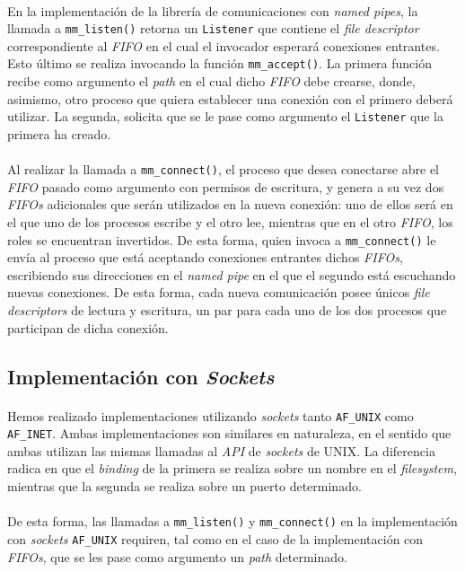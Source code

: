 \documentclass[spanish]{article}
\begin{document}
\paragraph{} En la implementación de la librería de comunicaciones con \textit{named pipes}, la llamada a \verb|mm_listen()| retorna un \verb|Listener| que contiene el \textit{file descriptor} correspondiente al \textit{FIFO} en el cual el invocador esperará conexiones entrantes. Esto último se realiza invocando la función \verb|mm_accept()|. La primera función recibe como argumento el \textit{path} en el cual dicho \textit{FIFO} debe crearse, donde, asimismo, otro proceso que quiera establecer una conexión con el primero deberá utilizar. La segunda, solicita que se le pase como argumento el \verb|Listener| que la primera ha creado.
\paragraph{} Al realizar la llamada a \verb|mm_connect()|, el proceso que desea conectarse abre el \textit{FIFO} pasado como argumento con permisos de escritura, y genera a su vez dos \textit{FIFOs} adicionales que serán utilizados en la nueva conexión: uno de ellos será en el que uno de los procesos escribe y el otro lee, mientras que en el otro \textit{FIFO}, los roles se encuentran invertidos. De esta forma, quien invoca a \verb|mm_connect()| le envía al proceso que está aceptando conexiones entrantes dichos \textit{FIFOs}, escribiendo sus direcciones en el \textit{named pipe} en el que el segundo está escuchando nuevas conexiones. De esta forma, cada nueva comunicación posee únicos \textit{file descriptors} de lectura y escritura, un par para cada uno de los dos procesos que participan de dicha conexión.
\subsection{Implementación con \textit{Sockets}}
\paragraph{} Hemos realizado implementaciones utilizando \textit{sockets} tanto \verb|AF_UNIX| como \verb|AF_INET|. Ambas implementaciones son similares en naturaleza, en el sentido que ambas utilizan las mismas llamadas al \textit{API} de \textit{sockets} de UNIX. La diferencia radica en que el \textit{binding} de la primera se realiza sobre un nombre en el \textit{filesystem}, mientras que la segunda se realiza sobre un puerto determinado.
\paragraph{} De esta forma, las llamadas a \verb|mm_listen()| y \verb|mm_connect()| en la implementación con \textit{sockets} \verb|AF_UNIX| requiren, tal como en el caso de la implementación con \textit{FIFOs}, que se les pase como argumento un \textit{path} determinado.
\end{document}
